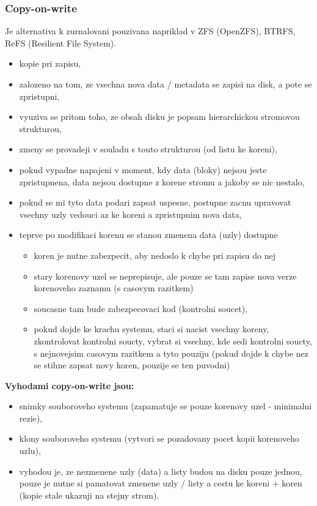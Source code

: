 \documentclass[a4paper, 11pt]{article}
\begin{document}
\subsubsection{Copy-on-write}
Je alternativa k zurnalovani pouzivana napriklad v ZFS (OpenZFS), BTRFS, ReFS (Resilient File System).
\begin{itemize}
    \item kopie pri zapisu,
    \item zalozeno na tom, ze vsechna nova data / metadata se zapisi na disk, a pote se zpristupni,
    \item vyuziva se pritom toho, ze obsah disku je popsam hierarchickou stromovou strukturou,
    \item zmeny se provadeji v souladu s touto strukturou (od listu ke koreni),
    \item pokud vypadne napajeni v moment, kdy data (bloky) nejsou jeste zpristupnena, data nejsou dostupne z korene stromu a jakoby se nic nestalo,
    \item pokud se mi tyto data podari zapsat uspesne, postupne zacnu upravovat vsechny uzly vedouci az ke koreni a zpristupnim nova data,
    \item teprve po modifikaci korenu se stanou zmenena data (uzly) dostupne
    \begin{itemize}
        \item koren je nutne zabezpecit, aby nedoslo k chybe pri zapisu do nej
        \item stary korenovy uzel se neprepisuje, ale pouze se tam zapise nova verze korenoveho zaznamu (s casovym razitkem)
        \item soucasne tam bude zabezpecovaci kod (kontrolni soucet),
        \item pokud dojde ke krachu systemu, staci si nacist vsechny koreny, zkontrolovat kontrolni soucty, vybrat si vsechny, kde sedi kontrolni soucty, s nejnovejsim casovym razitkem a tyto pouziju (pokud dojde k chybe nez se stihne zapsat novy koren, pouzije se ten puvodni) \\
    \end{itemize}
\end{itemize}

\textbf{Vyhodami copy-on-write jsou:}
\begin{itemize}
    \item snimky souboroveho systemu (zapamatuje se pouze korenovy uzel - minimalni rezie),
    \item klony souboroveho systemu (vytvori se pozadovany pocet kopii korenoveho uzlu),
    \item vyhodou je, ze nezmenene uzly (data) a listy budou na disku pouze jednou, pouze je nutne si pamatovat zmenene uzly / listy a cestu ke koreni + koren (kopie stale ukazuji na stejny strom). \\
\end{itemize}
\end{document}
